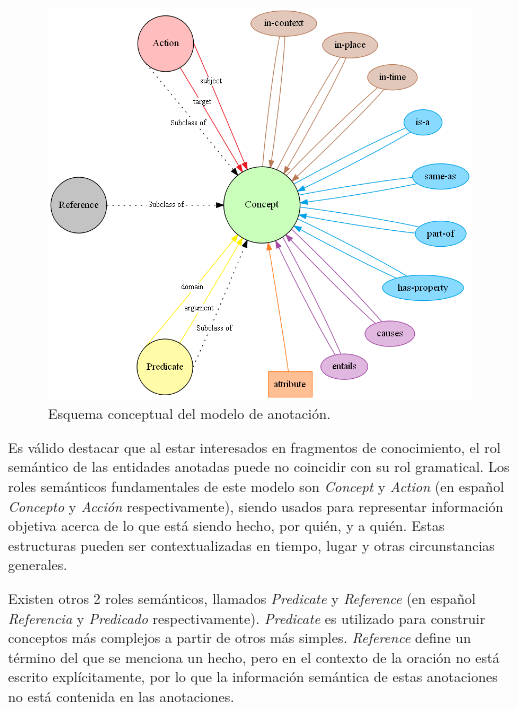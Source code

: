 \begin{figure}[h!]
	\includegraphics[width=\linewidth]{graphics/annotation_model.png}
	\caption[Esquema conceptual del modelo de anotación]{Esquema conceptual del modelo de anotación.}
	\label{fig:annotation_model}
\end{figure}

Es válido destacar que al estar interesados en fragmentos de conocimiento, el rol semántico de las entidades anotadas puede no coincidir con su rol gramatical. Los roles semánticos fundamentales de este modelo son \textit{Concept} y \textit{Action} (en español \textit{Concepto} y \textit{Acción} respectivamente), siendo usados para representar información objetiva acerca de lo que está siendo hecho, por quién, y a quién. Estas estructuras pueden ser contextualizadas en tiempo, lugar y otras circunstancias generales.

Existen otros 2 roles semánticos, llamados \textit{Predicate} y \textit{Reference} (en español \textit{Referencia} y \textit{Predicado} respectivamente). \textit{Predicate} es utilizado para construir conceptos más complejos a partir de otros más simples. \textit{Reference} define un término del que se menciona un hecho, pero en el contexto de la oración no está escrito explícitamente, por lo que la información semántica de estas anotaciones no está contenida en las anotaciones.

